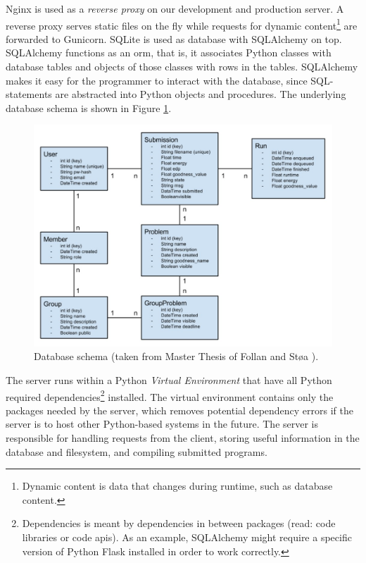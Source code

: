 Nginx \cite{NGINX} is used as a \textit{reverse proxy} on our development and production server. A reverse proxy serves static files on the fly while requests for dynamic content\footnote{Dynamic content is data that changes during runtime, such as database content.} are forwarded to Gunicorn. SQLite \cite{SQLITE} is used as database with SQLAlchemy \cite{SQLALCHEMY} on top. SQLAlchemy functions as an \gls{orm}, that is, it associates Python classes with database tables and objects of those classes with rows in the tables. SQLAlchemy makes it easy for the programmer to interact with the database, since SQL-statements are abstracted into Python objects and procedures. The underlying database schema is shown in Figure \ref{fig:old-database-schema}.\\

\begin{figure}
  \centering
  \includegraphics[width=1.0\textwidth]{figs/old_database_schema.jpg}
  \caption[Database schema.]{Database schema (taken from Master Thesis of Follan and Støa \cite{mt:T&S}).}
  \label{fig:old-database-schema}
\end{figure}

The server runs within a Python \textit{Virtual Environment} \cite{VIRTUALENV} that have all Python required dependencies\footnote{Dependencies is meant by dependencies in between packages (read: code libraries or code \gls{api}s). As an example, SQLAlchemy might require a specific version of Python Flask installed in order to work correctly.} installed. The virtual environment contains only the packages needed by the server, which removes potential dependency errors if the server is to host other Python-based systems in the future. The server is responsible for handling requests from the client, storing useful information in the database and filesystem, and compiling submitted programs. \\

